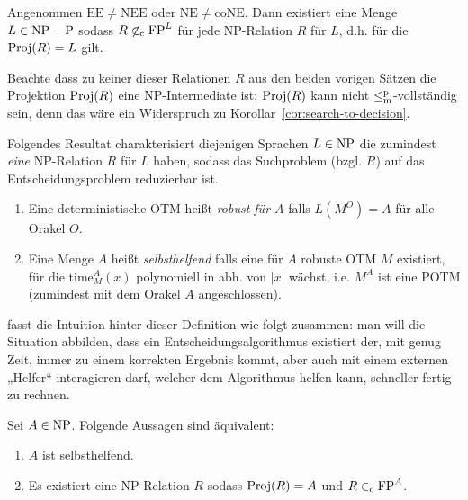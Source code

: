 \begin{theorem}
Angenommen $\mathrm{EE\neq NEE}$ oder $\mathrm{NE\neq coNE}$. Dann existiert eine Menge $L\in\mathrm{NP}-\mathrm{P}$ sodass $R\not\in_\mathrm{c} \mathrm{FP}^L$ für jede NP-Relation $R$ für $L$, d.h. für die $\operatorname{Proj}(R)=L$ gilt.
\end{theorem}
Beachte dass zu keiner dieser Relationen $R$ aus den beiden vorigen Sätzen die Projektion $\operatorname{Proj}(R)$ eine NP-Intermediate ist; $\operatorname{Proj}(R)$ kann nicht $\leq_\mathrm{m}^\mathrm{p}$-vollständig sein, denn das wäre ein Widerspruch zu Korollar~\ref{cor:search-to-decision}.

Folgendes Resultat charakterisiert diejenigen Sprachen $L\in\mathrm{NP}$ die zumindest \emph{eine} NP-Relation $R$ für $L$ haben, sodass das Suchproblem (bzgl. $R$) auf das Entscheidungsproblem reduzierbar ist.
\begin{definition}
    \begin{enumerate}
        \item Eine deterministische OTM heißt \emph{robust für $A$} falls $L(M^O)=A$ für alle Orakel $O$.
        \item Eine Menge $A$ heißt \emph{selbsthelfend} falls eine für $A$ robuste OTM $M$ existiert, für die $\mathrm{time}_M^A(x)$ polynomiell in abh. von $|x|$ wächst, i.e. $M^A$ ist eine POTM (zumindest mit dem Orakel $A$ angeschlossen).\qedhere
    \end{enumerate}
\end{definition}
\citeauthor{balcazar_self_1989} fasst die Intuition hinter dieser Definition wie folgt zusammen: man will die Situation abbilden, dass ein Entscheidungsalgorithmus existiert der, mit genug Zeit, immer zu einem korrekten Ergebnis kommt, aber auch mit einem externen „Helfer“ interagieren darf, welcher dem Algorithmus helfen kann, schneller fertig zu rechnen.
\begin{theorem}
    Sei $A\in \mathrm{NP}$. Folgende Aussagen sind äquivalent:
    \begin{enumerate}
        \item $A$ ist selbsthelfend.
        \item Es existiert eine NP-Relation $R$ sodass $\operatorname{Proj}(R)=A$ und $R\in_\mathrm{c} \mathrm{FP}^{A}$.
    \end{enumerate}
\end{theorem}

